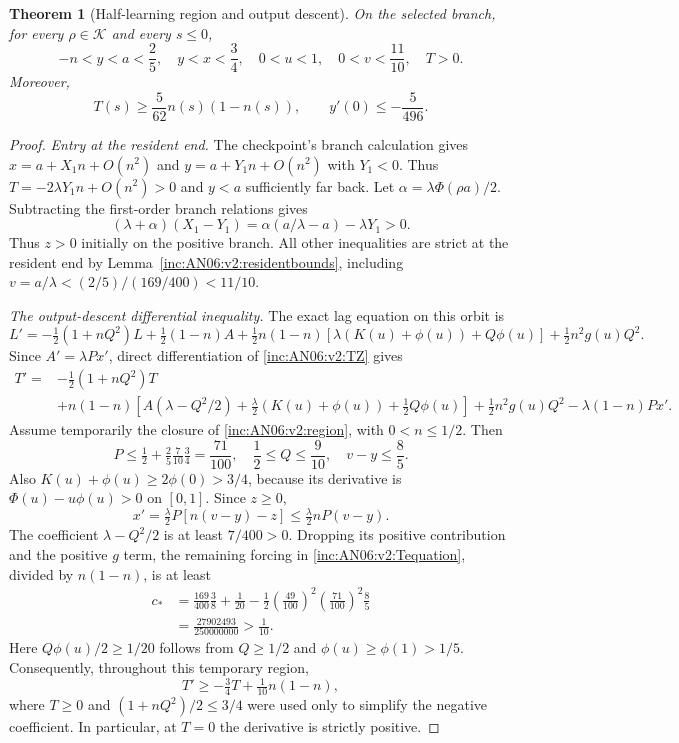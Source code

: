 \documentclass[11pt]{article}
\numberwithin{equation}{section}
\newtheorem{theorem}{Theorem}[section]
\theoremstyle{remark}\newtheorem{remark}[theorem]{Remark}
\newcommand{\1}{\mathbf 1}
\begin{document}
\begin{theorem}[Half-learning region and output descent]
\label{inc:AN06:v2:regiontheorem}
On the selected branch, for every $\rho\in\mathcal K$ and every $s\le0$,
\begin{equation}\label{inc:AN06:v2:region}
 -n<y<a<\frac25,\quad y<x<\frac34,\quad
 0<u<1,\quad 0<v<\frac{11}{10},\quad T>0.
\end{equation}
Moreover,
\begin{equation}\label{inc:AN06:v2:Tlower}
 T(s)\ge\frac5{62}n(s)(1-n(s)),\qquad
 y'(0)\le-\frac5{496}.
\end{equation}
\end{theorem}
\begin{proof}
\emph{Entry at the resident end.}
The checkpoint's branch calculation gives
$x=a+X_1n+O(n^2)$ and $y=a+Y_1n+O(n^2)$ with $Y_1<0$.
Thus $T=-2\lambda Y_1n+O(n^2)>0$ and $y<a$ sufficiently far back.
Let $\alpha=\lambda\Phi(\rho a)/2$. Subtracting the first-order branch
relations gives
\[
 (\lambda+\alpha)(X_1-Y_1)
 =\alpha(a/\lambda-a)-\lambda Y_1>0.
\]
Thus $z>0$ initially on the positive branch. All other inequalities are
strict at the resident end by Lemma~\ref{inc:AN06:v2:residentbounds},
including $v=a/\lambda<(2/5)/(169/400)<11/10$.

\emph{The output-descent differential inequality.}
The exact lag equation on this orbit is
\[
 L'=-\tfrac12(1+nQ^2)L+\tfrac12(1-n)A
 +\tfrac12n(1-n)[\lambda(K(u)+\phi(u))+Q\phi(u)]
 +\tfrac12n^2g(u)Q^2.
\]
Since $A'=\lambda P x'$, direct differentiation of
\eqref{inc:AN06:v2:TZ} gives
\begin{align}
 T'={}&-\tfrac12(1+nQ^2)T\nonumber\\
 &+n(1-n)\left[A(\lambda-Q^2/2)
       +\tfrac\lambda2(K(u)+\phi(u))+\tfrac12Q\phi(u)\right]
       +\tfrac12n^2g(u)Q^2
       -\lambda(1-n)P x'.
 \label{inc:AN06:v2:Tequation}
\end{align}
Assume temporarily the closure of \eqref{inc:AN06:v2:region}, with
$0<n\le1/2$. Then
\[
 P\le\tfrac12+\tfrac25\tfrac7{10}\tfrac34=\frac{71}{100},\quad
 \frac12\le Q\le\frac9{10},\quad v-y\le\frac85.
\]
Also $K(u)+\phi(u)\ge2\phi(0)>3/4$, because its derivative is
$\Phi(u)-u\phi(u)>0$ on $[0,1]$. Since $z\ge0$,
\[
 x'=\tfrac\lambda2 P[n(v-y)-z]
 \le\tfrac\lambda2 nP(v-y).
\]
The coefficient $\lambda-Q^2/2$ is at least $7/400>0$.
Dropping its positive contribution and the positive $g$ term, the remaining
forcing in \eqref{inc:AN06:v2:Tequation}, divided by $n(1-n)$, is at least
\begin{align*}
 c_*&=\frac{169}{400}\frac38+\frac1{20}
       -\frac12\left(\frac{49}{100}\right)^2
                \left(\frac{71}{100}\right)^2\frac85\\
 &=\frac{27902493}{250000000}>\frac1{10}.
\end{align*}
Here $Q\phi(u)/2\ge1/20$ follows from $Q\ge1/2$ and
$\phi(u)\ge\phi(1)>1/5$.
Consequently, throughout this temporary region,
\begin{equation}\label{inc:AN06:v2:Tinequality}
 T'\ge-\tfrac34 T+\tfrac1{10}n(1-n),
\end{equation}
where $T\ge0$ and $(1+nQ^2)/2\le3/4$ were used only to simplify the
negative coefficient. In particular, at $T=0$ the derivative is strictly
positive.


\end{proof}
\end{document}
